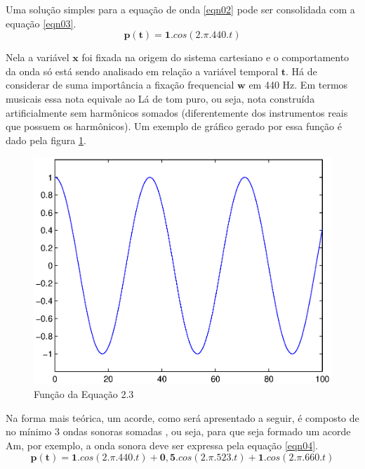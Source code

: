 Uma solução simples para a equação de onda \ref{eqn02} pode ser consolidada com a equação \ref{eqn03}.
\begin{equation}
\label{eqn03}
	\mathbf{p(t)} = \mathbf{1}.{cos}(2.\pi.440.t)
\end{equation}

\newpage
Nela a variável $\textbf{x}$ foi fixada na origem do sistema cartesiano e o comportamento da onda só está sendo analisado em relação a variável temporal $\textbf{t}$. Há de considerar de suma importância a fixação frequencial $\textbf{w}$ em 440 Hz. Em termos musicais essa nota equivale ao Lá de tom puro, ou seja, nota construída artificialmente sem harmônicos somados (diferentemente dos instrumentos reais que possuem os harmônicos). Um exemplo de gráfico gerado por essa função é dado pela figura \ref{fig_cos440}.
\begin{figure}[h]
	\centering
		\includegraphics[scale=0.7]{figuras/cos440.eps}
	\caption{Função da Equação 2.3}
	\label{fig_cos440}
\end{figure}

Na forma mais teórica, um acorde, como será apresentado a seguir, é composto de no mínimo 3 ondas sonoras somadas \cite{med1996teoria}, ou seja, para que seja formado um acorde Am, por exemplo, a onda sonora deve ser expressa pela equação \ref{eqn04}.
\begin{equation}
\label{eqn04}
	\mathbf{p(t)} = \mathbf{1}.{cos}(2.\pi.440.t) + \mathbf{0,5}.{cos}(2.\pi.523.t) + \mathbf{1}.{cos}(2.\pi.660.t)
\end{equation}

